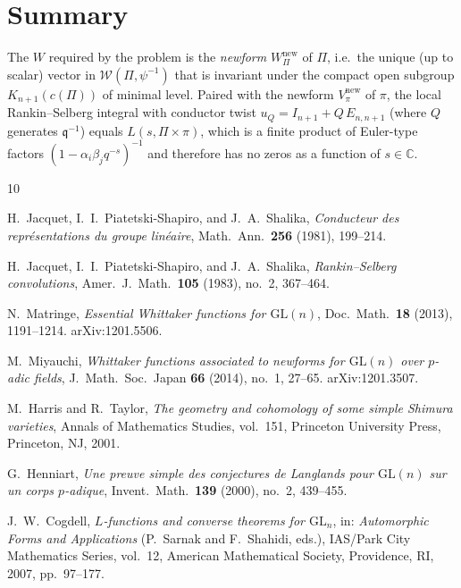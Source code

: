 \documentclass[12pt]{article}
\begin{document}
\section{Summary}

The $W$ required by the problem is the \emph{newform} $W_\Pi^{\mathrm{new}}$
of $\Pi$, i.e.\ the unique (up to scalar) vector in $\mathcal{W}(\Pi,\psi^{-1})$
that is invariant under the compact open subgroup $K_{n+1}(c(\Pi))$ of minimal
level.  Paired with the newform $V_\pi^{\mathrm{new}}$ of $\pi$, the local
Rankin--Selberg integral with conductor twist $u_Q = I_{n+1} + Q\,E_{n,n+1}$
(where $Q$ generates $\mathfrak{q}^{-1}$) equals $L(s,\Pi\times\pi)$, which
is a finite product of Euler-type factors $(1-\alpha_i\beta_j q^{-s})^{-1}$
and therefore has no zeros as a function of $s \in \mathbb{C}$.

\begin{thebibliography}{10}

H.\ Jacquet, I.\ I.\ Piatetski-Shapiro, and J.\ A.\ Shalika,
\emph{Conducteur des repr\'esentations du groupe lin\'eaire},
Math.\ Ann.\ \textbf{256} (1981), 199--214.

H.\ Jacquet, I.\ I.\ Piatetski-Shapiro, and J.\ A.\ Shalika,
\emph{Rankin--Selberg convolutions},
Amer.\ J.\ Math.\ \textbf{105} (1983), no.\ 2, 367--464.

N.\ Matringe,
\emph{Essential Whittaker functions for $\mathrm{GL}(n)$},
Doc.\ Math.\ \textbf{18} (2013), 1191--1214.
arXiv:1201.5506.

M.\ Miyauchi,
\emph{Whittaker functions associated to newforms for $\mathrm{GL}(n)$ over
$p$-adic fields},
J.\ Math.\ Soc.\ Japan \textbf{66} (2014), no.\ 1, 27--65.
arXiv:1201.3507.

M.\ Harris and R.\ Taylor,
\emph{The geometry and cohomology of some simple Shimura varieties},
Annals of Mathematics Studies, vol.\ 151, Princeton University Press,
Princeton, NJ, 2001.

G.\ Henniart,
\emph{Une preuve simple des conjectures de Langlands pour $\mathrm{GL}(n)$ sur
un corps $p$-adique},
Invent.\ Math.\ \textbf{139} (2000), no.\ 2, 439--455.

J.\ W.\ Cogdell,
\emph{$L$-functions and converse theorems for $\mathrm{GL}_n$},
in: \emph{Automorphic Forms and Applications} (P.\ Sarnak and F.\ Shahidi,
eds.), IAS/Park City Mathematics Series, vol.\ 12, American Mathematical
Society, Providence, RI, 2007, pp.\ 97--177.

\end{thebibliography}
\end{document}
